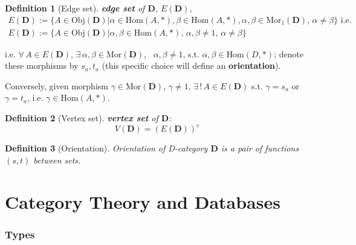 \documentclass[10pt]{amsart}
\newtheorem{definition}{Definition}
\begin{document}
\begin{multicols*}{2}
\begin{definition}[Edge set]
	\textbf{edge set} of $\mathbf{D}$, $E(\mathbf{D})$, 
\begin{equation}
\begin{gathered}
E(\mathbf{D}) := \lbrace A \in \text{Obj}(\mathbf{D}) | \alpha \in \text{Hom}(A, *), \beta \in \text{Hom}(A, *), \alpha, \beta \in \text{Mor}_{1}(\mathbf{D}), \, \alpha \neq \beta \rbrace \text{ i.e. } \\
E(\mathbf{D}) := \lbrace A \in \text{Obj}(\mathbf{D}) | \alpha, \beta \in \text{Hom}(A, *), \, \alpha, \beta \neq 1, \, \alpha \neq \beta \rbrace
\end{gathered}
\end{equation}	
\end{definition}
i.e. $\forall \, A \in E(\mathbf{D})$, $\exists \, \alpha, \beta \in \text{Mor}(\mathbf{D})$, \, $\alpha, \beta \neq 1$, s.t. $\alpha, \beta \in \text{Hom}(D, *)$; denote these morphisms by $s_a,t_a$ (this specific choice will define an \textbf{orientation}).

Conversely, given morphism $\gamma \in \text{Mor}(\mathbf{D})$, $\gamma \neq 1$, $\exists \, ! \, A \in E(\mathbf{D})$ s.t. $\gamma = s_a$ or $\gamma = t_a$, i.e. $\gamma \in \text{Hom}(A, *)$. 

\begin{definition}[Vertex set]
\textbf{vertex set} of $\mathbf{D}$:
\begin{equation}
 V(\mathbf{D}) = (E(\mathbf{D}))^c
\end{equation} 
\end{definition}

\begin{definition}[Orientation]
	Orientation of D-category $\mathbf{D}$ is a pair of functions $(s,t)$ between sets.
	
\end{definition}


	

\part{Category Theory and Databases} 
	
\section{Types}


\end{multicols*}
\end{document}
